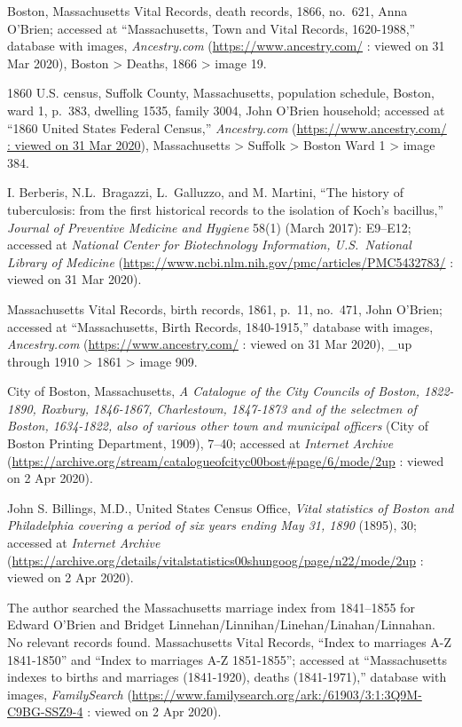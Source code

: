 \begin{thebibliography}{999}
	Boston, Massachusetts Vital Records, death records, 1866, no.\ 621, Anna O'Brien; accessed at ``Massachusetts, Town and Vital Records, 1620-1988,'' database with images, \textit{Ancestry.com} (\url{https://www.ancestry.com/} : viewed on 31 Mar 2020), Boston > Deaths, 1866 > image 19.
	
	1860 U.S. census, Suffolk County, Massachusetts, population schedule, Boston, ward 1, p.\ 383, dwelling 1535, family 3004, John O'Brien household; accessed at ``1860 United States Federal Census,'' \textit{Ancestry.com} (\url{https://www.ancestry.com/ : viewed on 31 Mar 2020}), Massachusetts > Suffolk > Boston Ward 1 > image 384.
	
	I. Berberis, N.L.\ Bragazzi, L.\ Galluzzo, and M. Martini, ``The history of tuberculosis: from the first historical records to the isolation of Koch's bacillus,'' \textit{Journal of Preventive Medicine and Hygiene} 58(1) (March 2017): E9--E12; accessed at \textit{National Center for Biotechnology Information, U.S.\ National Library of Medicine} (\url{https://www.ncbi.nlm.nih.gov/pmc/articles/PMC5432783/} : viewed on 31 Mar 2020).
	
	Massachusetts Vital Records, birth records, 1861, p.\ 11, no.\ 471, John O'Brien; accessed at ``Massachusetts, Birth Records, 1840-1915,'' database with images, \textit{Ancestry.com} (\url{https://www.ancestry.com/} : viewed on 31 Mar 2020), \_up through 1910 > 1861 > image 909.
	
	City of Boston, Massachusetts, \textit{A Catalogue of the City Councils of Boston, 1822-1890, Roxbury, 1846-1867, Charlestown, 1847-1873 and of the selectmen of Boston, 1634-1822, also of various other town and municipal officers} (City of Boston Printing Department, 1909), 7--40; accessed at \textit{Internet Archive} (\url{https://archive.org/stream/catalogueofcityc00bost#page/6/mode/2up} : viewed on 2 Apr 2020).
	
	John S. Billings, M.D., United States Census Office, \textit{Vital statistics of Boston and Philadelphia covering a period of six years ending May 31, 1890} (1895), 30; accessed at \textit{Internet Archive} (\url{https://archive.org/details/vitalstatistics00shungoog/page/n22/mode/2up} : viewed on 2 Apr 2020). 
	
	The author searched the Massachusetts marriage index from 1841--1855 for Edward O'Brien and Bridget Linnehan/Linnihan/Linehan/Linahan/Linnahan. No relevant records found.	
	Massachusetts Vital Records, ``Index to marriages A-Z 1841-1850'' and ``Index to marriages A-Z 1851-1855''; accessed at ``Massachusetts indexes to births and marriages (1841-1920), deaths (1841-1971),'' database with images, \textit{FamilySearch} (\url{https://www.familysearch.org/ark:/61903/3:1:3Q9M-C9BG-SSZ9-4} : viewed on 2 Apr 2020).
	

\end{thebibliography}
